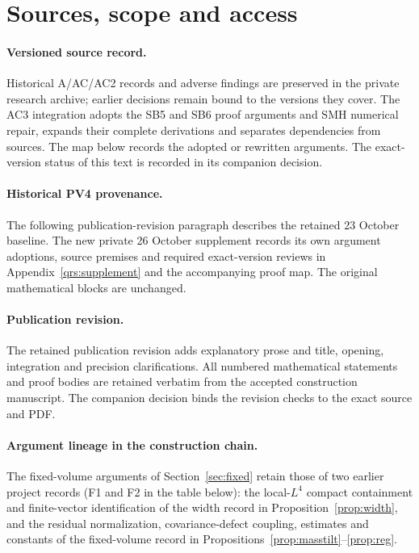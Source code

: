 \documentclass[11pt]{article}
\theoremstyle{plain}
\theoremstyle{definition}
\theoremstyle{remark}
\begin{document}
\section{Sources, scope and access}\label{app:provenance}

\paragraph{Versioned source record.} Historical A/AC/AC2 records and adverse
findings are preserved in the private research archive; earlier decisions
remain bound to the versions they cover. The AC3 integration adopts the
SB5 and SB6 proof arguments and SMH numerical repair, expands their complete
derivations and separates dependencies from sources. The map below records
the adopted or rewritten arguments. The exact-version status of this text
is recorded in its companion decision.

\paragraph{Historical PV4 provenance.} The following publication-revision
paragraph describes the retained 23 October baseline. The new private
26 October supplement records its own argument adoptions, source premises
and required exact-version reviews in Appendix~\ref{qrs:supplement} and the
accompanying proof map. The original mathematical blocks are unchanged.

\paragraph{Publication revision.} The retained publication revision adds explanatory prose and title, opening, integration and precision clarifications. All numbered mathematical statements and proof bodies are retained verbatim from the accepted construction manuscript. The companion decision binds the revision checks to the exact source and PDF.

\paragraph{Argument lineage in the construction chain.}
The fixed-volume arguments of Section~\ref{sec:fixed} retain those of two earlier
project records (F1 and F2 in the table below): the local-$L^{4}$ compact
containment and finite-vector identification of the width record in
Proposition~\ref{prop:width}, and the residual normalization, covariance-defect
coupling, estimates and constants of the fixed-volume record in
Propositions~\ref{prop:masstilt}--\ref{prop:reg}.
\end{document}
